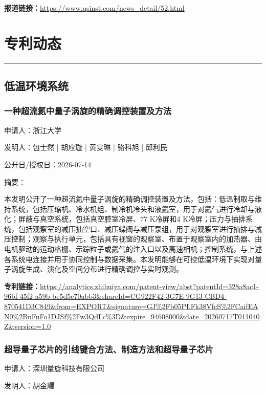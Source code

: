 \documentclass[12pt,a4paper]{ctexart}
\begin{document}
\noindent\textbf{报道链接：}\url{https://www.qsinst.com/news\_detail/52.html}



\newpage
\section{专利动态}
\vspace{-0.5em}
\noindent\rule{\linewidth}{1.5pt}

\subsection{ 低温环境系统 }

\subsubsection{ 一种超流氦中量子涡旋的精确调控装置及方法 }

申请人：浙江大学

发明人：包士然 | 胡应璇 | 黄雯琳 | 骆科旭 | 邱利民

公开日/授权日：2026-07-14

摘要：

本发明公开了一种超流氦中量子涡旋的精确调控装置及方法，包括：低温制取与维持系统，包括压缩机、冷水机组、制冷机冷头和液氦室，用于对氦气进行冷却与液化；屏蔽与真空系统，包括真空腔室冷屏、77 K冷屏和4 K冷屏；压力与抽排系统，包括观察室的减压抽空口、减压蝶阀与减压泵组，用于对观察室进行抽排与减压控制；观察与执行单元，包括具有视窗的观察室、布置于观察室内的加热器、由电机驱动的运动格栅、示踪粒子或氦气的注入口以及高速相机；控制系统，与上述各系统电连接并用于协同控制与数据采集。本发明能够在可控低温环境下实现对量子涡旋生成、演化及空间分布进行精确调控与实时观测。

\noindent\textbf{专利链接：}\url{https://analytics.zhihuiya.com/patent-view/abst?patentId=328a8ac1-96bf-45f2-a59b-be5d5e70abb3&shareId=CG922F42-3G7E-9G13-CBD4-870541D3C849&from=EXPORT&signature=GJ%2Fb05PLFk38VfcS%2FCaifEAN0%2BnFnFo1DJSf%2Fw3QdLc%3D&expire=94608000&date=20260717T011040Z&version=1.0}

\subsubsection{ 超导量子芯片的引线键合方法、制造方法和超导量子芯片 }

申请人：深圳量旋科技有限公司

发明人：胡金耀
\end{document}
